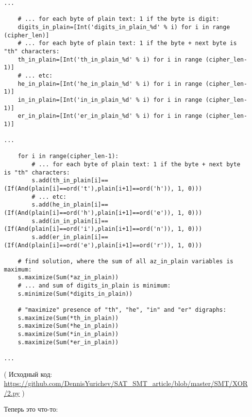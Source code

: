 \begin{lstlisting}
...

    # ... for each byte of plain text: 1 if the byte is digit:
    digits_in_plain=[Int('digits_in_plain_%d' % i) for i in range (cipher_len)]
    # ... for each byte of plain text: 1 if the byte + next byte is "th" characters:
    th_in_plain=[Int('th_in_plain_%d' % i) for i in range (cipher_len-1)]
    # ... etc:
    he_in_plain=[Int('he_in_plain_%d' % i) for i in range (cipher_len-1)]
    in_in_plain=[Int('in_in_plain_%d' % i) for i in range (cipher_len-1)]
    er_in_plain=[Int('er_in_plain_%d' % i) for i in range (cipher_len-1)]

...

    for i in range(cipher_len-1):
        # ... for each byte of plain text: 1 if the byte + next byte is "th" characters:
        s.add(th_in_plain[i]==(If(And(plain[i]==ord('t'),plain[i+1]==ord('h')), 1, 0)))
        # ... etc:
        s.add(he_in_plain[i]==(If(And(plain[i]==ord('h'),plain[i+1]==ord('e')), 1, 0)))
        s.add(in_in_plain[i]==(If(And(plain[i]==ord('i'),plain[i+1]==ord('n')), 1, 0)))
        s.add(er_in_plain[i]==(If(And(plain[i]==ord('e'),plain[i+1]==ord('r')), 1, 0)))

    # find solution, where the sum of all az_in_plain variables is maximum:
    s.maximize(Sum(*az_in_plain))
    # ... and sum of digits_in_plain is minimum:
    s.minimize(Sum(*digits_in_plain))

    # "maximize" presence of "th", "he", "in" and "er" digraphs:
    s.maximize(Sum(*th_in_plain))
    s.maximize(Sum(*he_in_plain))
    s.maximize(Sum(*in_in_plain))
    s.maximize(Sum(*er_in_plain))

...
\end{lstlisting}

( Исходный код: \url{https://github.com/DennisYurichev/SAT_SMT_article/blob/master/SMT/XOR/2.py} )

Теперь это что-то:

